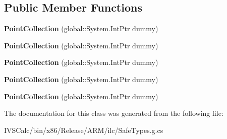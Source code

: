 \subsection*{Public Member Functions}
\begin{DoxyCompactItemize}
\item 
\mbox{\label{class_windows_1_1_u_i_1_1_xaml_1_1_media_1_1_point_collection_acdd4b380cc48ca3bc3c4363b09bba83b}} 
{\bfseries Point\+Collection} (global\+::\+System.\+Int\+Ptr dummy)
\item 
\mbox{\label{class_windows_1_1_u_i_1_1_xaml_1_1_media_1_1_point_collection_acdd4b380cc48ca3bc3c4363b09bba83b}} 
{\bfseries Point\+Collection} (global\+::\+System.\+Int\+Ptr dummy)
\item 
\mbox{\label{class_windows_1_1_u_i_1_1_xaml_1_1_media_1_1_point_collection_acdd4b380cc48ca3bc3c4363b09bba83b}} 
{\bfseries Point\+Collection} (global\+::\+System.\+Int\+Ptr dummy)
\item 
\mbox{\label{class_windows_1_1_u_i_1_1_xaml_1_1_media_1_1_point_collection_acdd4b380cc48ca3bc3c4363b09bba83b}} 
{\bfseries Point\+Collection} (global\+::\+System.\+Int\+Ptr dummy)
\item 
\mbox{\label{class_windows_1_1_u_i_1_1_xaml_1_1_media_1_1_point_collection_acdd4b380cc48ca3bc3c4363b09bba83b}} 
{\bfseries Point\+Collection} (global\+::\+System.\+Int\+Ptr dummy)
\end{DoxyCompactItemize}


The documentation for this class was generated from the following file\+:\begin{DoxyCompactItemize}
\item 
I\+V\+S\+Calc/bin/x86/\+Release/\+A\+R\+M/ilc/Safe\+Types.\+g.\+cs\end{DoxyCompactItemize}
